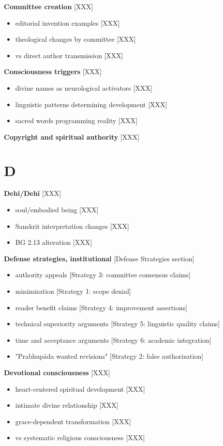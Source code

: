 \documentclass[11pt,twoside]{book}
\begin{document}
\textbf{\textbf{Committee creation}} {[}XXX]
\begin{itemize}
\item editorial invention examples [XXX]
\item theological changes by committee [XXX]
\item vs direct author transmission [XXX]
\end{itemize}

\textbf{\textbf{Consciousness triggers}} {[}XXX]
\begin{itemize}
\item divine names as neurological activators [XXX]
\item linguistic patterns determining development [XXX]
\item sacred words programming reality [XXX]
\end{itemize}

\textbf{\textbf{Copyright and spiritual authority}} {[}XXX]
\section*{D}
\label{sec:orgf7622f9}

\textbf{\textbf{Dehi/Dehī}} {[}XXX]
\begin{itemize}
\item soul/embodied being [XXX]
\item Sanskrit interpretation changes [XXX]
\item BG 2.13 alteration [XXX]
\end{itemize}

\textbf{\textbf{Defense strategies, institutional}} {[}Defense Strategies section]
\begin{itemize}
\item authority appeals [Strategy 3: committee consensus claims]
\item minimization [Strategy 1: scope denial]
\item reader benefit claims [Strategy 4: improvement assertions]
\item technical superiority arguments [Strategy 5: linguistic quality claims]
\item time and acceptance arguments [Strategy 6: academic integration]
\item "Prabhupāda wanted revisions" [Strategy 2: false authorization]
\end{itemize}

\textbf{\textbf{Devotional consciousness}} {[}XXX]
\begin{itemize}
\item heart-centered spiritual development [XXX]
\item intimate divine relationship [XXX]
\item grace-dependent transformation [XXX]
\item vs systematic religious consciousness [XXX]
\end{itemize}
\end{document}
